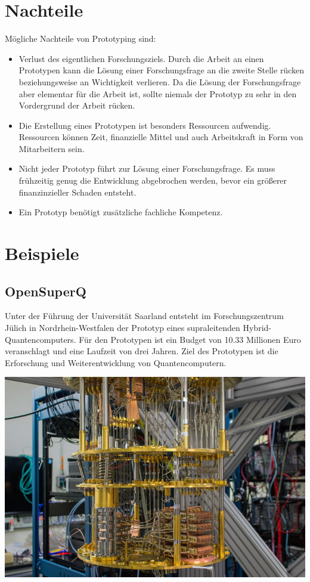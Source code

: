 \documentclass[a0,portrait]{a0poster}
\begin{document}
\begin{multicols}{2}
\section*{Nachteile}
Mögliche Nachteile von Prototyping sind:
\begin{itemize}
    \item Verlust des eigentlichen Forschungsziels. Durch die Arbeit an einen Prototypen kann die Lösung einer Forschungsfrage an die zweite Stelle rücken beziehungsweise an Wichtigkeit verlieren. Da die Lösung der Forschungsfrage aber elementar für die Arbeit ist, sollte niemals der Prototyp zu sehr in den Vordergrund der Arbeit rücken.
    \item Die Erstellung eines Prototypen ist besonders Ressourcen aufwendig. Ressourcen können Zeit, finanzielle Mittel und auch Arbeitskraft in Form von Mitarbeitern sein.
    \item Nicht jeder Prototyp führt zur Lösung einer Forschungsfrage. Es muss frühzeitig genug die Entwicklung abgebrochen werden, bevor ein größerer finanzinzieller Schaden entsteht.
    \item Ein Prototyp benötigt zusätzliche fachliche Kompetenz.
\end{itemize}

\section*{Beispiele}
\subsection*{OpenSuperQ}
Unter der Führung der Universität Saarland entsteht im Forschungszentrum Jülich in Nordrhein-Westfalen der Prototyp eines supraleitenden Hybrid-Quantencomputers. Für den Prototypen ist ein Budget von 10.33 Millionen Euro veranschlagt und eine Laufzeit von drei Jahren\cite{QUANTUM}. Ziel des Prototypen ist die Erforschung und Weiterentwicklung von Quantencomputern.
\begin{center}\vspace{1cm}
\includegraphics[width=0.8\linewidth]{ibm.jpg}
\end{center}\vspace{1cm}


\end{multicols}
\end{document}
